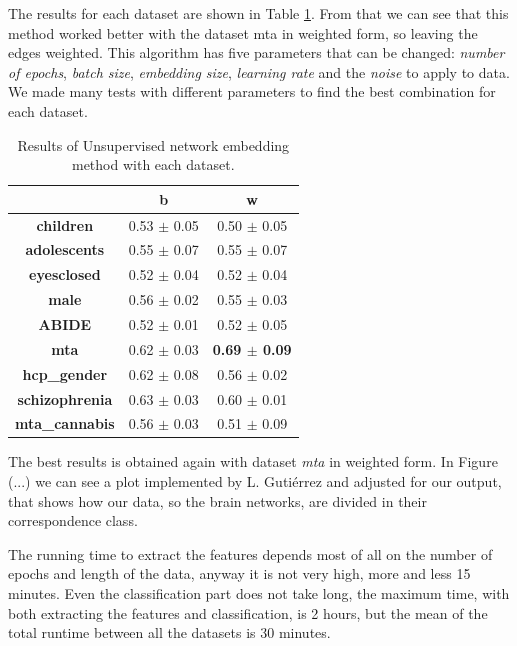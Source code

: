 The results for each dataset are shown in Table \ref{tab:embs}. From that we can see that this method worked better with the dataset mta in weighted form, so leaving the edges weighted. This algorithm has five parameters that can be changed: \textit{number of epochs}, \textit{batch size}, \textit{embedding size}, \textit{learning rate} and the \textit{noise} to apply to data. We made many tests with different parameters to find the best combination for each dataset.
\vspace{0.5cm}

\begin{table}
	\centering
	\begin{tabular}{c|l|c} 
		\toprule
		& \multicolumn{1}{c|}{b} & w                \\ 
		\midrule
		\textbf{children}      & 0.53 $\pm$ 0.05        & 0.50 $\pm$ 0.05  \\
		\textbf{adolescents}   & 0.55 $\pm$ 0.07        & 0.55 $\pm$ 0.07  \\
		\textbf{eyesclosed}    & 0.52 $\pm$ 0.04        & 0.52 $\pm$ 0.04  \\
		\textbf{male}          & 0.56 $\pm$ 0.02        & 0.55 $\pm$ 0.03  \\
		\textbf{ABIDE}         & 0.52 $\pm$ 0.01        & 0.52 $\pm$ 0.05  \\
		\textbf{mta}           & 0.62 $\pm$ 0.03        & \textbf{0.69 $\pm$ 0.09}  \\
		\textbf{hcp\_gender}   & 0.62 $\pm$ 0.08        & 0.56 $\pm$ 0.02  \\
		\textbf{schizophrenia} & 0.63 $\pm$ 0.03        & 0.60 $\pm$ 0.01  \\
		\textbf{mta\_cannabis} & 0.56 $\pm$ 0.03        & 0.51 $\pm$ 0.09 
	\end{tabular}
	\caption{Results of Unsupervised network embedding method with each dataset.}
	\label{tab:embs}
\end{table}

The best results is obtained again with dataset \textit{mta} in weighted form. In Figure (...) we can see a plot implemented by L. Guti\'{e}rrez and adjusted for our output, that shows how our data, so the brain networks, are divided in their correspondence class.
\vspace{0.5cm}

The running time to extract the features depends most of all on the number of epochs and length of the data, anyway it is not very high, more and less 15 minutes. Even the classification part does not take long, the maximum time, with both extracting the features and classification, is 2 hours, but the mean of the total runtime between all the datasets is 30 minutes.

